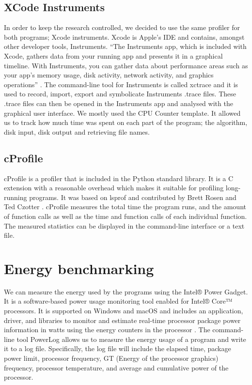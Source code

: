 \subsection{XCode Instruments}
In order to keep the research controlled, we decided to use the same profiler for both programs; Xcode instruments. Xcode is Apple’s IDE and contains, amongst other developer tools, Instruments. “The Instruments app, which is included with Xcode, gathers data from your running app and presents it in a graphical timeline. With Instruments, you can gather data about performance areas such as your app’s memory usage, disk activity, network activity, and graphics operations” \cite{instruments}. The command-line tool for Instruments is called xctrace and it is used to record, import, export and symbolicate Instruments .trace files. These .trace files can then be opened in the Instruments app and analysed with the graphical user interface. We mostly used the CPU Counter template. It allowed us to track how much time was spent on each part of the program; the algorithm, disk input, disk output and retrieving file names.

\subsection{cProfile}
cProfile is a profiler that is included in the Python standard library. It is a C extension with a reasonable overhead which makes it suitable for profiling long-running programs. It was based on lsprof and contributed by Brett Rosen and Ted Czotter \cite{cprofile}. cProfile measures the total time the program runs, and the amount of function calls as well as the time and function calls of each individual function. The measured statistics can be displayed in the command-line interface or a text file.

\section{Energy benchmarking}
We can measure the energy used by the programs using the Intel® Power Gadget. It is a software-based power usage monitoring tool enabled for Intel® Core™ processors. It is supported on Windows and macOS and includes an application, driver, and libraries to monitor and estimate real-time processor package power information in watts using the energy counters in the processor \cite{powergadget}. The command-line tool PowerLog allows us to measure the energy usage of a program and write it to a log file. Specifically, the log file will include the elapsed time, package power limit, processor frequency, GT (Energy of the processor graphics) frequency, processor temperature, and average and cumulative power of the processor.

